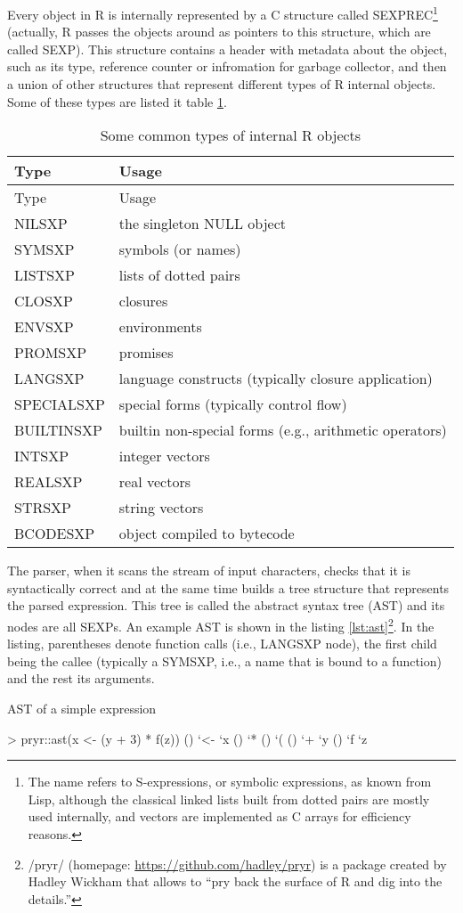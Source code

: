 {Every object in R is internally represented by a C structure called SEXPREC\footnote{The name refers to S-expressions, or symbolic expressions, as known from Lisp, although the classical linked lists built from dotted pairs are mostly used internally, and vectors are implemented as C arrays for efficiency reasons.} (actually, R passes the objects around as pointers to this structure, which are called SEXP). This structure contains a header with metadata about the object, such as its type, reference counter or infromation for garbage collector, and then a union of other structures that represent different types of R internal objects. Some of these types are listed it table \ref{tab:sexp-types}.

\begin{longtable}[c]{@{}ll@{}}
\caption{Some common types of internal R objects\label{tab:sexp-types}} \tabularnewline
\toprule
Type & Usage \tabularnewline
\midrule
\endfirsthead
\toprule
Type & Usage \tabularnewline
\midrule
\endhead
NILSXP & the singleton NULL object \tabularnewline
SYMSXP & symbols (or names) \tabularnewline
LISTSXP & lists of dotted pairs \tabularnewline
CLOSXP & closures \tabularnewline
ENVSXP & environments \tabularnewline
PROMSXP & promises \tabularnewline
LANGSXP & language constructs (typically closure application) \tabularnewline
SPECIALSXP & special forms (typically control flow)\tabularnewline
BUILTINSXP & builtin non-special forms (e.g., arithmetic operators) \tabularnewline
INTSXP & integer vectors \tabularnewline
REALSXP & real vectors \tabularnewline
STRSXP & string vectors \tabularnewline
BCODESXP & object compiled to bytecode \tabularnewline
\bottomrule
\end{longtable}

The parser, when it scans the stream of input characters, checks that it is syntactically correct and at the same time builds a tree structure that represents the parsed expression. This tree is called the abstract syntax tree (AST) and its nodes are all SEXPs. An example AST is shown in the listing \ref{lst:ast}\footnote{\rinline/pryr/ (homepage: \url{https://github.com/hadley/pryr}) is a package created by Hadley Wickham that allows to ``pry back the surface of R and dig into the details.''}. In the listing, parentheses denote function calls (i.e., LANGSXP node), the first child being the callee (typically a SYMSXP, i.e., a name that is bound to a function) and the rest its arguments.

\begin{listing}[htbp]
  \caption{\label{lst:ast}AST of a simple expression}
  \begin{rcode}
> pryr::ast(x <- (y + 3) * f(z))
\- ()
  \- `<-
  \- `x
  \- ()
    \- `*
    \- ()
      \- `(
      \- ()
        \- `+
        \- `y
    \- ()
      \- `f
      \- `z
  \end{rcode}
\end{listing}

}

